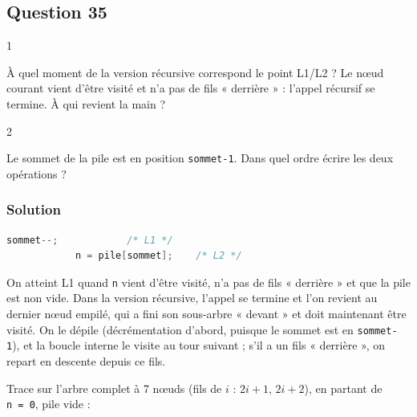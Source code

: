 \documentclass[11pt,a4paper]{article}
\begin{document}
\hypertarget{question-35}{%
\subsection{Question 35}\label{question-35}}

\begin{indication}{1}

À quel moment de la version récursive correspond le point L1/L2 ? Le nœud courant vient d'être visité et n'a pas de fils « derrière » : l'appel récursif se termine. À qui revient la main ?

\end{indication}

\begin{indication}{2}

Le sommet de la pile est en position \texttt{sommet-1}. Dans quel ordre écrire les deux opérations ?

\end{indication}

\hypertarget{solution-34}{%
\subsubsection{Solution}\label{solution-34}}

\begin{lstlisting}[language=C]
            sommet--;            /* L1 */
            n = pile[sommet];    /* L2 */
\end{lstlisting}

On atteint L1 quand \texttt{n} vient d'être visité, n'a pas de fils « derrière » et que la pile est non vide. Dans la version récursive, l'appel se termine et l'on revient au dernier nœud empilé, qui a fini son sous-arbre « devant » et doit maintenant être visité. On le dépile (décrémentation d'abord, puisque le sommet est en \texttt{sommet-1}), et la boucle interne le visite au tour suivant ; s'il a un fils « derrière », on repart en descente depuis ce fils.

Trace sur l'arbre complet à 7 nœuds (fils de \(i\) : \(2i+1\), \(2i+2\)), en partant de \texttt{n\ =\ 0}, pile vide :
\end{document}
